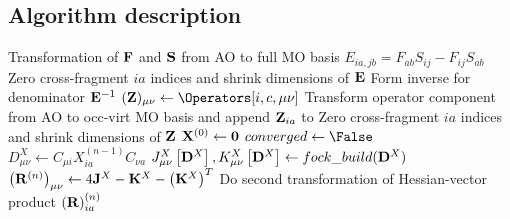 \documentclass[%
  class = book,%
  crop = false,%
  float = true,%
  multi = true,%
  preview = false,%
]{standalone}
\begin{document}
\subsection{Algorithm description}

\algnewcommand{}
\algnewcommand{}
\algnewcommand{}
\algnewcommand{}
\algnewcommand{}
\algnewcommand{}
\algnewcommand{}
\algnewcommand{}
\algnewcommand{}

\begin{algorithm}
  \centering
  \begin{algorithmic}[1]
    \State Transformation of \(\mathbf{F}\) and \(\mathbf{S}\) from AO to full MO basis
    \State \(E_{ia,jb} = F_{ab}S_{ij} - F_{ij}S_{ab}\)
    \If{\Not{} \AllowCT{}}
      \State Zero cross-fragment \(ia\) indices and shrink dimensions of \(\mathbf{E}\)
    \EndIf
    \State Form inverse for denominator \(\mathbf{E}^{-1}\)
  \EndFor
      \State \((\mat{Z})_{\mu\nu} \gets \Operators[i,c,\mu\nu]\)
      \State Transform operator component from AO to occ-virt MO basis and append \(\mathbf{Z}_{ia}\) to \Rhsvecs
      \If{\Not{} \AllowCT{}}
        \State Zero cross-fragment \(ia\) indices and shrink dimensions of \(\mathbf{Z}\)
      \EndIf
      \State \(\mathbf{X}^{(0)} \gets \mathbf{0}\)
      \State \(converged \gets \False\)
        \State \(D_{\mu\nu}^{X} \gets C_{\mu i} X_{ia}^{(n-1)} C_{\nu a}\)
        \State \(J_{\mu\nu}^{X}\left[\mathbf{D}^{X}\right], K_{\mu\nu}^{X}\left[\mathbf{D}^{X}\right] \gets fock\_build(\mathbf{D}^{X})\)
        \State \(\left(\mathbf{R}^{(n)}\right)_{\mu\nu} \gets 4 \mathbf{J}^{X} - \mathbf{K}^{X} - \left(\mathbf{K}^{X}\right)^{T}\)
        \State Do second transformation of Hessian-vector product \(\left(\mathbf{R}\right)_{ia}^{(n)}\)

\end{algorithmic}
\end{algorithm}
\end{document}
